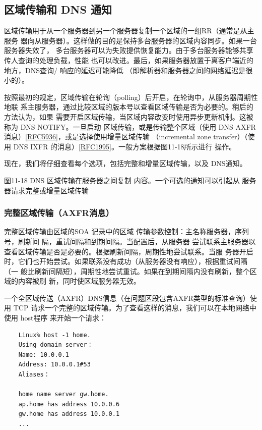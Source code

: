 \subsection{区域传输和 DNS 通知}

区域传输用于从一个服务器到另一个服务器复制一个区域的一组RR（通常是从主服务
器向从服务器）。这样做的目的是保持多台服务器的区域内容同步。如果一台服务器失效了，
多台服务器可以为失败提供恢复能力。由于多台服务器能够共享传人查询的处理负载，性能
也可以改进。最后，如果服务器放置于离客户端近的地方，DNS查询/ 响应的延迟可能降低
（即解析器和服务器之间的网络延迟是很小的）。

按照最初的规定，区域传输在轮询（polling）后开启，在轮询中，从服务器周期性地联
系主服务器，通过比较区域的版本号以查看区域传输是否为必要的。稍后的方法认为，如果
需要开启区域传输，当区域内容改变时使用异步更新机制。这被称为 DNS NOTIFY。一旦启动
区域传输，或是传输整个区域（使用 DNS AXFR消息）\href{https://www.rfc-editor.org/rfc/rfc5936}{[RFC5936]}，或是选择使用增量区域传输
（incremental zone transfer）（使用 DNS IXFR 的消息）\href{https://www.rfc-editor.org/rfc/rfc1995}{[RFC1995]}。一般方案根据图11-18所示进行
操作。

现在，我们将仔细查看每个选项，包括完整和增量区域传输，以及 DNS通知。

图11-18
DNS 区域传输在服务器之间复制
内容。一个可选的通知可以引起从
服务器请求完整或增量区域传输

\subsubsection{完整区域传输（AXFR消息）}

完整区域传输由区域的SOA 记录中的区域
传输参数控制：主名称服务器，序列号，刷新间
隔，重试间隔和到期间隔。当配置后，从服务器
尝试联系主服务器以查看区域传输是否是必要的。根据刷新间隔，周期性地尝试联系。当服
务器开启时，它们也开始尝试。如果联系没有成功（从服务器没有响应），根据重试间隔（一
般比刷新间隔短），周期性地尝试重试。如果在到期间隔内没有刷新，整个区域的内容被刷
新，同时使区域服务器无效。

一个全区域传送（AXFR）DNS信息（在问题区段包含AXFR类型的标准查询）使用
TCP 请求一个完整的区域传输。为了查看这样的消息，我们可以在本地网络中使用 host程序
来开始一个请求：

\begin{verbatim}
    Linux% host -1 home.
    Using domain server：
    Name: 10.0.0.1
    Address: 10.0.0.1#53
    Aliases：

    home name server gw.home.
    ap.home has address 10.0.0.6
    gw.home has address 10.0.0.1
    ...
\end{verbatim}

